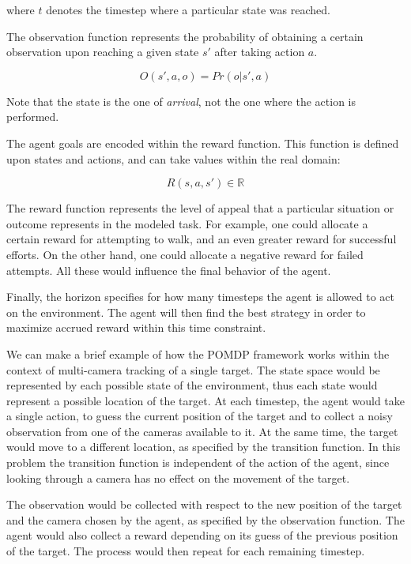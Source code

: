 where $t$ denotes the timestep where a particular state was reached.

The observation function represents the probability of obtaining a certain observation upon reaching
a given state $s'$ after taking action $a$.

\begin{equation}
 O(s', a, o) = Pr(o | s', a)
\end{equation}

Note that the state is the one of \textit{arrival}, not the one where the action is performed.

The agent goals are encoded within the reward function. This function is defined upon states and
actions, and can take values within the real domain:

\begin{equation}
 R(s, a, s') \in \mathbb{R}
\end{equation}

The reward function represents the level of appeal that a particular situation or outcome represents
in the modeled task. For example, one could allocate a certain reward for attempting to walk, and an
even greater reward for successful efforts. On the other hand, one could allocate a negative reward
for failed attempts. All these would influence the final behavior of the agent.

Finally, the horizon specifies for how many timesteps the agent is allowed to act on the
environment. The agent will then find the best strategy in order to maximize accrued reward within
this time constraint.

We can make a brief example of how the POMDP framework works within the context of multi-camera
tracking of a single target. The state space would be represented by each possible state of the
environment, thus each state would represent a possible location of the target. At each timestep,
the agent would take a single action, to guess the current position of the target and to collect a
noisy observation from one of the cameras available to it. At the same time, the target would move
to a different location, as specified by the transition function. In this problem the transition
function is independent of the action of the agent, since looking through a camera has no effect on
the movement of the target.

The observation would be collected with respect to the new position of the target and the camera
chosen by the agent, as specified by the observation function. The agent would also collect a reward
depending on its guess of the previous position of the target. The process would then repeat for
each remaining timestep.


